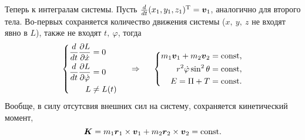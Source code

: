 Теперь к интегралам системы. Пусть $\frac{d }{d t} (x_1, y_1, z_1)^{\text{T}} = \mbox{\boldmath $v$}_1$, аналогично для второго тела. Во-первых сохраняется количество движения системы
($x, \ y, \ z$ не входят явно в $L$), также не входят $t, \ \varphi$, тогда
\begin{equation}
    \left\{\begin{aligned}
        \frac{d }{d t} \frac{\partial L}{\partial \dot{x}} &= 0 \\
        \frac{d }{d t} \frac{\partial L}{\partial \dot{\varphi}} &= 0 \\
        L &\neq L(t)
    \end{aligned}\right.    
    \hspace{0.5cm} \Rightarrow \hspace{0.5cm} 
    \left\{\begin{aligned}
        m_1 \mbox{\boldmath $v$}_1 + m_2 \mbox{\boldmath $v$}_2 &= \text{const}, \\
        r^2 \dot{\varphi} \sin^2 \theta  &= \text{const}, \\
        E = \Pi + T &= \text{const}.
    \end{aligned}\right.
\end{equation}
Вообще, в силу отсутсвия внешних сил на систему, сохраняется кинетический момент,
\begin{equation}
    \mbox{\boldmath $K$} = m_1 \mbox{\boldmath $r$}_1 \times \mbox{\boldmath $v$}_1 + 
    m_2 \mbox{\boldmath $r$}_2 \times \mbox{\boldmath $v$}_2 = \text{const}.
\end{equation}
